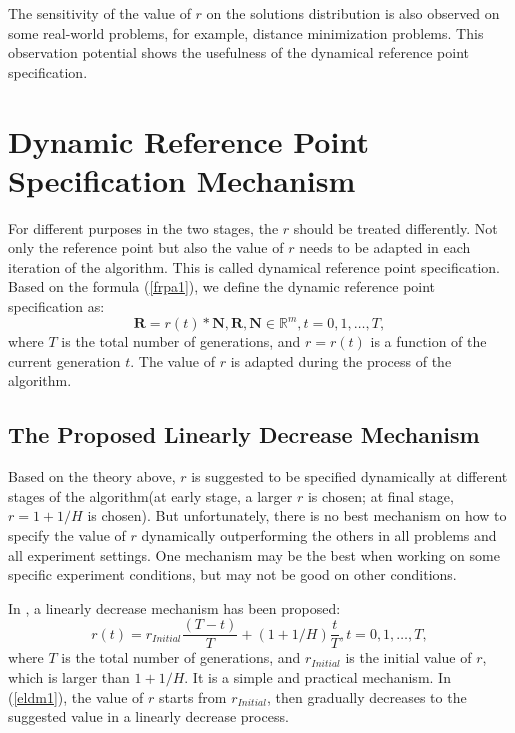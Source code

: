 \documentclass[conference]{IEEEtran}
\begin{document}
The sensitivity of the value of $r$ on the solutions distribution is also observed on some real-world problems,
for example, distance minimization problems. 
This observation potential shows the usefulness of the dynamical reference point specification\cite{hisao:dynamic}.

\section{Dynamic Reference Point Specification Mechanism}
For different purposes in the two stages, the $r$ should be treated differently\cite{hisao:dynamic}. 
Not only the reference point but also the value of $r$ 
needs to be adapted in each iteration of the algorithm. 
This is called dynamical reference point specification. 
Based on the formula (\ref{frpa1}), 
we define the dynamic reference point specification as:
\begin{equation}\label{f2}
  \boldsymbol R = r(t) * \boldsymbol N, 
  \boldsymbol R, \boldsymbol N \in \mathbb{R}^m, t=0,1,\dots,T,
\end{equation}
where $T$ is the total number of generations, and $r=r(t)$ is a function of the current generation $t$.
The value of $r$ is adapted during the process of the algorithm. 

% 
\subsection{The Proposed Linearly Decrease Mechanism} 
Based on the theory above, $r$ is suggested to be specified dynamically at different stages of
the algorithm(at early stage, a larger $r$ is chosen; at final stage, $r=1+1/H$ is chosen).
But unfortunately, there is no best mechanism on how to specify the value of $r$ dynamically
outperforming the others in all problems and all experiment settings. One mechanism may be the best
when working on some specific experiment conditions, but may not be good on other conditions. 

In \cite{hisao:dynamic}, a linearly decrease mechanism has been proposed:
\begin{equation}\label{eldm1}
  r(t)=r_{Initial}\frac{(T-t)}{T}+(1+1/H)\frac{t}{T}, t=0,1,\dots,T,
\end{equation}
where $T$ is the total number of generations, and $r_{Initial}$ is the initial value of $r$,
which is larger than $1+1/H$. 
It is a simple and practical mechanism. In (\ref{eldm1}), the value of $r$ starts from $r_{Initial}$,
then gradually decreases to the suggested value in a linearly decrease process. 
\end{document}

